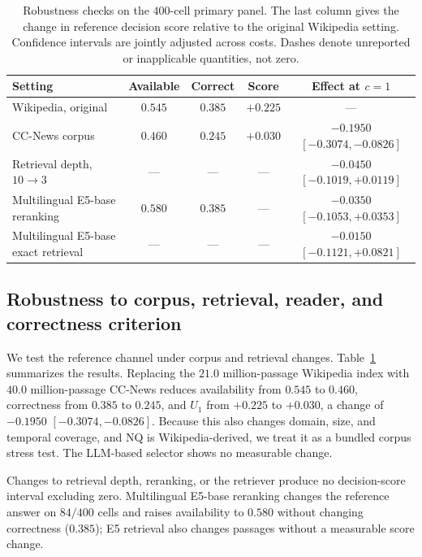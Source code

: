\documentclass[sigconf]{acmart}
\begin{document}
\begin{table}[t]
\centering
\scriptsize
\setlength{\tabcolsep}{3pt}
\caption{Robustness checks on the $400$-cell primary panel.
The last column gives the change in reference decision score relative
to the original Wikipedia setting. Confidence intervals are jointly
adjusted across costs. Dashes denote unreported or inapplicable
quantities, not zero.}
\label{tab:reference-robustness}
\begin{tabular}{@{}lcccc@{}}
\toprule
Setting
& Available
& Correct
& Score
& Effect at $c{=}1$ \\
\midrule
Wikipedia, original
& $0.545$
& $0.385$
& $+0.225$
& --- \\

CC-News corpus
& $0.460$
& $0.245$
& $+0.030$
& $-0.1950$ $[-0.3074,-0.0826]$ \\

Retrieval depth, $10\to3$
& ---
& ---
& ---
& $-0.0450$ $[-0.1019,+0.0119]$ \\

Multilingual E5-base reranking~\cite{wang2024multilingual}
& $0.580$
& $0.385$
& ---
& $-0.0350$ $[-0.1053,+0.0353]$ \\

Multilingual E5-base exact retrieval
& ---
& ---
& ---
& $-0.0150$ $[-0.1121,+0.0821]$ \\

\bottomrule
\end{tabular}
\end{table}


\subsection{Robustness to corpus, retrieval, reader, and correctness criterion}
\label{sec:res-robust}

We test the reference channel under corpus and retrieval changes.
Table~\ref{tab:reference-robustness} summarizes the results. Replacing
the $21.0$ million-passage Wikipedia index with $40.0$ million-passage
CC-News reduces availability from $0.545$ to $0.460$, correctness from
$0.385$ to $0.245$, and $U_1$ from $+0.225$ to $+0.030$, a change of
$-0.1950$ $[-0.3074,\allowbreak -0.0826]$. Because this also changes
domain, size, and temporal coverage, and NQ is Wikipedia-derived, we
treat it as a bundled corpus stress test. The LLM-based selector shows
no measurable change.

Changes to retrieval depth, reranking, or the retriever produce no
decision-score interval excluding zero. Multilingual E5-base reranking
changes the reference answer on $84/400$ cells and raises availability
to $0.580$ without changing correctness ($0.385$); E5 retrieval also
changes passages without a measurable score change.
\end{document}
